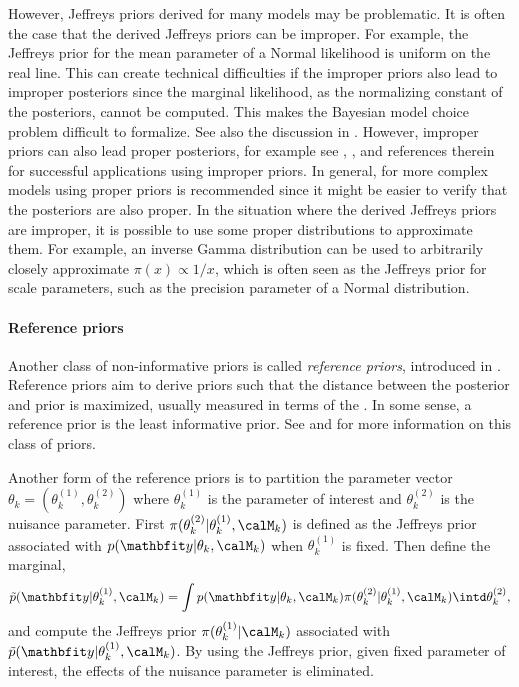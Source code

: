 However, Jeffreys priors derived for many models may be problematic. It is
often the case that the derived Jeffreys priors can be improper. For example,
the Jeffreys prior for the mean parameter of a Normal likelihood is uniform on
the real line. This can create technical difficulties if the improper priors
also lead to improper posteriors since the marginal likelihood, as the
normalizing constant of the posteriors, cannot be computed. This makes the
Bayesian model choice problem difficult to formalize. See also the discussion
in \cite{Kass:1995vb}. However, improper priors can also lead proper
posteriors, for example see \cite[][sec.~2.9]{Gelman:2003vx},
\cite[][sec.~1.5]{Robert:2007tc}, \cite{Kass:1995vb} and references therein
for successful applications using improper priors. In general, for more
complex models using proper priors is recommended since it might be easier to
verify that the posteriors are also proper. In the situation where the derived
Jeffreys priors are improper, it is possible to use some proper distributions
to approximate them. For example, an inverse Gamma distribution can be used to
arbitrarily closely approximate $\pi(x)\propto1/x$, which is often seen as the
Jeffreys prior for scale parameters, such as the precision parameter of a
Normal distribution.

\paragraph{Reference priors}

Another class of non-informative priors is called \emph{reference priors},
introduced in \cite{Bernardo:1979uq}. Reference priors aim to derive priors
such that the distance between the posterior and prior is maximized, usually
measured in terms of the \kldfull \cite{Kullback:1951va}. In some sense, a
reference prior is the least informative prior. See \cite{Berger:1989vj,
Berger:1992kf, Berger:1992wo} and \cite[][sec.~5.4]{Bernardo:1994vd} for more
information on this class of priors.

Another form of the reference priors is to partition the parameter vector
$\theta_k = (\theta_k^{(1)},\theta_k^{(2)})$ where $\theta_k^{(1)}$ is the
parameter of interest and $\theta_k^{(2)}$ is the nuisance parameter. First
$\pi(\theta_k^{(2)}|\theta_k^{(1)},\calM_k)$ is defined as the Jeffreys prior
associated with $p(\data|\theta_k,\calM_k)$ when $\theta_k^{(1)}$ is fixed.
Then define the marginal,
\begin{equation}
  \tilde{p}(\data|\theta_k^{(1)},\calM_k) =
  \int p(\data|\theta_k,\calM_k)\pi(\theta_k^{(2)}|\theta_k^{(1)},\calM_k)
  \intd \theta_k^{(2)},
\end{equation}
and compute the Jeffreys prior $\pi(\theta_k^{(1)}|\calM_k)$ associated with
$\tilde{p}(\data|\theta_k^{(1)},\calM_k)$. By using the Jeffreys prior, given
fixed parameter of interest, the effects of the nuisance parameter is
eliminated.

